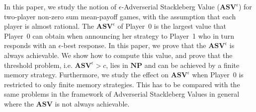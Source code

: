 In this paper, we study the notion of $\epsilon$-Adverserial Stackleberg Value ($\mathbf{ASV}^{\epsilon}$) for two-player non-zero sum mean-payoff games, with the assumption that each player is almost rational. The $\mathbf{ASV}^{\epsilon}$ of Player~0 is the largest value that Player~0 can obtain when announcing her strategy to Player~1 who in turn responds with an $\epsilon$-best response. In this paper, we prove that the $\mathbf{ASV}^{\epsilon}$ is always achievable. We show how to compute this value, and prove that the threshold problem, i.e. $\mathbf{ASV}^{\epsilon} > c$, lies in $\textbf{NP}$ and can be achieved by a finite memory strategy. Furthermore, we study the effect on $\mathbf{ASV}^{\epsilon}$ when Player~0 is restricted to only finite memory strategies. This has to be compared with the same problems in the framework of Adverserial Stackleberg Values in general where the $\mathbf{ASV}$ is not always achievable.